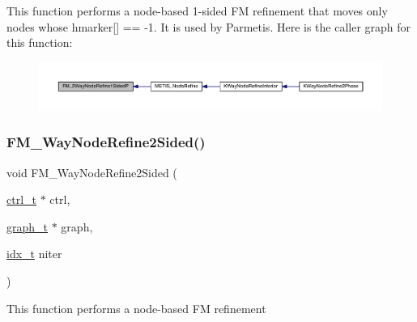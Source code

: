 This function performs a node-\/based 1-\/sided FM refinement that moves only nodes whose hmarker\mbox{[}\mbox{]} == -\/1. It is used by Parmetis. Here is the caller graph for this function\+:\nopagebreak
\begin{figure}[H]
\begin{center}
\leavevmode
\includegraphics[width=350pt]{a00945_a1d2b2b5145f4556102f25c25570bb80e_icgraph}
\end{center}
\end{figure}
\mbox{\label{a00945_ac1ce8eab68ef8a71c0a5097be9af5094}} 
\subsubsection{\texorpdfstring{F\+M\+\_\+Way\+Node\+Refine2\+Sided()}{FM\_2WayNodeRefine2Sided()}}
{\footnotesize\ttfamily void F\+M\+\_\+Way\+Node\+Refine2\+Sided (\begin{DoxyParamCaption}\item[{\hyperlink{a00742}{ctrl\+\_\+t} $\ast$}]{ctrl,  }\item[{\hyperlink{a00734}{graph\+\_\+t} $\ast$}]{graph,  }\item[{\hyperlink{a00876_aaa5262be3e700770163401acb0150f52}{idx\+\_\+t}}]{niter }\end{DoxyParamCaption})}

This function performs a node-\/based FM refinement \mbox{\label{a00945_a2e0b580a44dc7ec102b48ba7bf6b3797}} 
